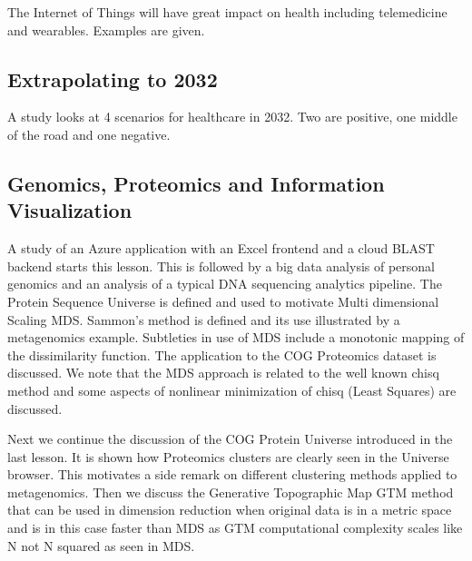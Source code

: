 The Internet of Things will have great impact on health including
telemedicine and wearables. Examples are given.



\subsection{Extrapolating to 2032}

A study looks at 4 scenarios for healthcare in 2032. Two are positive,
one middle of the road and one negative.



\subsection{Genomics, Proteomics and Information Visualization}

A study of an Azure application with an Excel frontend and a cloud BLAST
backend starts this lesson. This is followed by a big data analysis of
personal genomics and an analysis of a typical DNA sequencing analytics
pipeline. The Protein Sequence Universe is defined and used to motivate
Multi dimensional Scaling MDS. Sammon's method is defined and its use
illustrated by a metagenomics example. Subtleties in use of MDS include
a monotonic mapping of the dissimilarity function. The application to
the COG Proteomics dataset is discussed. We note that the MDS approach
is related to the well known chisq method and some aspects of nonlinear
minimization of chisq (Least Squares) are discussed.


\begin{comment}
\video{Health}{6:56}{ CC) Genomics, Proteomics and  Information Visualization}{https://drive.google.com/file/d/0B5plU-u0wqMoVzduODM0Z2dFYWM/view?usp=sharing}
\end{comment}

Next we continue the discussion of the COG Protein Universe introduced
in the last lesson. It is shown how Proteomics clusters are clearly seen
in the Universe browser. This motivates a side remark on different
clustering methods applied to metagenomics. Then we discuss the
Generative Topographic Map GTM method that can be used in dimension
reduction when original data is in a metric space and is in this case
faster than MDS as GTM computational complexity scales like N not N
squared as seen in MDS.

